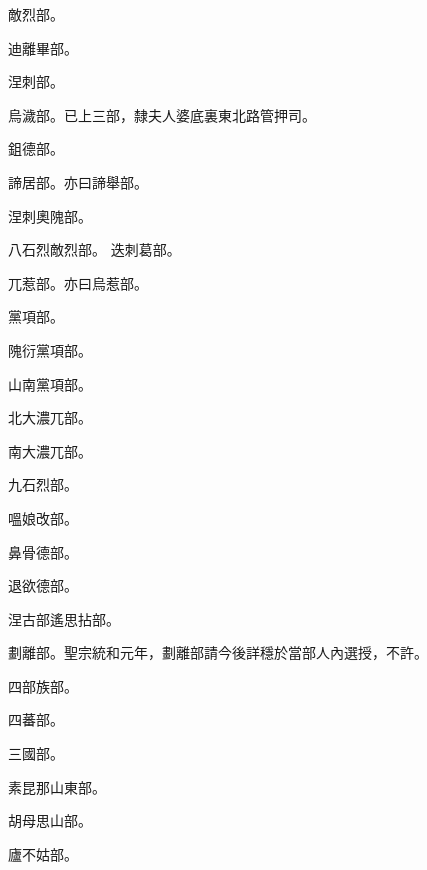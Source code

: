 \begin{pinyinscope}
 敵烈部。



 迪離畢部。



 涅刺部。



 烏濊部。已上三部，隸夫人婆底裏東北路管押司。



 鉏德部。



 諦居部。亦曰諦舉部。



 涅刺奧隗部。



 八石烈敵烈部。
 迭刺葛部。



 兀惹部。亦曰烏惹部。



 黨項部。



 隗衍黨項部。



 山南黨項部。



 北大濃兀部。



 南大濃兀部。



 九石烈部。



 嗢娘改部。



 鼻骨德部。



 退欲德部。



 涅古部遙思拈部。



 劃離部。聖宗統和元年，劃離部請今後詳穩於當部人內選授，不許。



 四部族部。



 四蕃部。



 三國部。



 素昆那山東部。



 胡母思山部。



 廬不姑部。




\end{pinyinscope}
